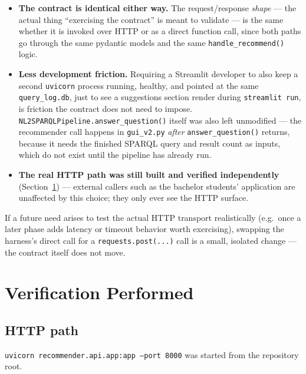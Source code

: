 \documentclass[11pt,a4paper]{article}
\newcommand{\code}[1]{\texttt{#1}}
\begin{document}
\begin{itemize}
    \item \textbf{The contract is identical either way.} The request/response \emph{shape} ---
        the actual thing ``exercising the contract'' is meant to validate --- is the same whether
        it is invoked over HTTP or as a direct function call, since both paths go through the same
        pydantic models and the same \code{handle\_recommend()} logic.
    \item \textbf{Less development friction.} Requiring a Streamlit developer to also keep a
        second \code{uvicorn} process running, healthy, and pointed at the same
        \code{query\_log.db}, just to see a suggestions section render during
        \code{streamlit run}, is friction the contract does not need to impose.
        \code{NL2SPARQLPipeline.answer\_question()} itself was also left unmodified --- the
        recommender call happens in \code{gui\_v2.py} \emph{after} \code{answer\_question()}
        returns, because it needs the finished SPARQL query and result count as inputs, which do
        not exist until the pipeline has already run.
    \item \textbf{The real HTTP path was still built and verified independently}
        (Section~\ref{sec:verification}) --- external callers such as the bachelor students'
        application are unaffected by this choice; they only ever see the HTTP surface.
\end{itemize}

If a future need arises to test the actual HTTP transport realistically (e.g.\ once a later phase
adds latency or timeout behavior worth exercising), swapping the harness's direct call for a
\code{requests.post(...)} call is a small, isolated change --- the contract itself does not move.

\newpage
\section{Verification Performed}
\label{sec:verification}

\subsection{HTTP path}

\code{uvicorn recommender.api.app:app --port 8000} was started from the repository root.
\end{document}
